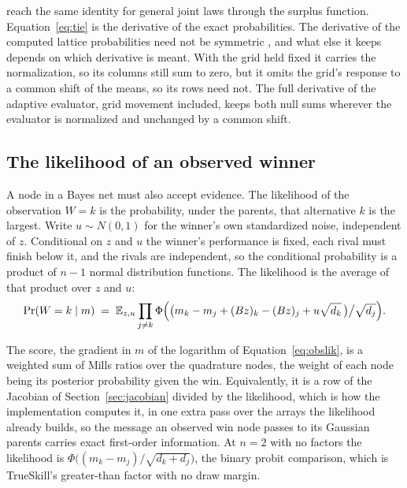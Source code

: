 \documentclass[11pt]{article}
\begin{document}
\citet{muller2019} reach the same identity for general joint laws
through the surplus function. Equation~\eqref{eq:tie} is the derivative of the
exact probabilities. The derivative of the computed lattice
probabilities need not be symmetric \citep[\S\S3.2, 5.2]{cotton2026},
and what else it keeps depends on which derivative is meant. With the
grid held fixed it carries the normalization, so its columns still sum
to zero, but it omits the grid's response to a common shift of the
means, so its rows need not. The full derivative of the adaptive
evaluator, grid movement included, keeps both null sums wherever the
evaluator is normalized and unchanged by a common shift.

\subsection{The likelihood of an observed winner}
\label{sec:observed}

A node in a Bayes net must also accept evidence. The likelihood of
the observation $W=k$ is the probability, under the parents, that
alternative $k$ is the largest. Write $u\sim N(0,1)$ for the winner's
own standardized noise, independent of $z$. Conditional on $z$ and
$u$ the winner's performance is fixed, each rival must finish below
it, and the rivals are independent, so the conditional probability is
a product of $n-1$ normal distribution functions. The likelihood is
the average of that product over $z$ and $u$:
\begin{equation}
\Pr(W=k\mid m)\;=\;\mathbb{E}_{z,u}\prod_{j\ne k}
\Phi\Bigl(\bigl(m_k-m_j+(Bz)_k-(Bz)_j+u\sqrt{d_k}\,\bigr)\big/\sqrt{d_j}\Bigr).
\label{eq:obslik}
\end{equation}

The score, the gradient in $m$ of the logarithm of
Equation~\eqref{eq:obslik}, is a
weighted sum of Mills ratios over the quadrature nodes, the weight of
each node being its posterior probability given the win.
Equivalently, it is a row of the Jacobian of
Section~\ref{sec:jacobian} divided by the likelihood, which is how the
implementation computes it, in one extra pass over the arrays the likelihood already
builds, so the message an observed win node passes to its Gaussian
parents carries exact first-order information. At
$n=2$ with no factors the likelihood is
$\Phi\bigl((m_k-m_j)/\sqrt{d_k+d_j}\bigr)$, the binary probit
comparison, which is TrueSkill's greater-than factor with no draw
margin.
\end{document}
